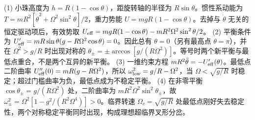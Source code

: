 (1) 小珠高度为 \(h=R(1-\cos\theta)\)，距旋转轴的半径为 \(R\sin\theta\)。惯性系动能为 \(T=mR^2[\dot\theta^2+\Omega^2\sin^2\theta]/2\)，重力势能 \(U=mgR(1-\cos\theta)\)。去掉与 \(\dot\theta\) 无关的恒定驱动项后，有效势取 \(U_{\rm eff}=mgR(1-\cos\theta)-mR^2\Omega^2\sin^2\theta/2\)。
(2) 平衡条件为 \(U_{\rm eff}'=mR\sin\theta(g-R\Omega^2\cos\theta)=0\)。因此总有 \(\theta=0\)（另有最高点 \(\theta=\pi\)），并在 \(\Omega^2>g/R\) 时出现对称的 \(\theta_\pm=\pm\arccos[g/(R\Omega^2)]\)。等号时两个新平衡与最低点重合，不是两个互异的新平衡。
(3) 一维约束方程 \(mR^2\ddot\theta=-U_{\rm eff}'(\theta)\)。最低点二阶曲率 \(U_{\rm eff}''(0)=mR(g-R\Omega^2)\)，所以 \(\omega_{\rm low}^2=g/R-\Omega^2\)，当 \(\Omega<\sqrt{g/R}\) 时稳定；超过门槛曲率为负，最低点成为不稳定平衡。
(4) 在非零平衡 \(\cos\theta_\pm=g/(R\Omega^2)\) 处，二阶曲率为 \(mR^2\Omega^2\sin^2\theta_\pm\)，故 \(\omega_\pm^2=\Omega^2[1-g^2/(R^2\Omega^4)]>0\)。临界转速 \(\Omega_c=\sqrt{g/R}\) 处最低点刚好失去稳定性，两个对称稳定平衡同时出现，构成理想超临界叉形分岔。

